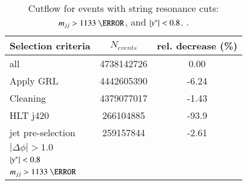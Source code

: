 \begin{table}[htbp]
	\centering
	\begin{tabular}{l|c|c}
		\hline\hline
		Selection criteria & $N_{events}$ & rel. decrease (\%) \\
		\hline
		all      &	4738142726	&	0.00	\\
		Apply GRL 	& 	4442605390        & 	-6.24	 \\
		Cleaning	 & 	4379077017	 & 	-1.43	 \\
		HLT j420	 & 	266104885	 & 	-93.9	 \\
		jet pre-selection	 &     259157844        &      -2.61    \\
		$|\Delta\phi| > 1.0$	 & 		 & 		 \\
		$|y^\ast| < 0.8$	 & 		 & 	 \\
		$\mjj>1133~\GeV$	 & 		 & 	 \\
		\hline\hline
	\end{tabular}
	\caption{Cutflow for
		events with string resonance cuts:  $\mjj>1133~\GeV$, and $|y^\ast|<0.8$. .
		\label{tab:cutFlow_wstar_run2} }
\end{table}

